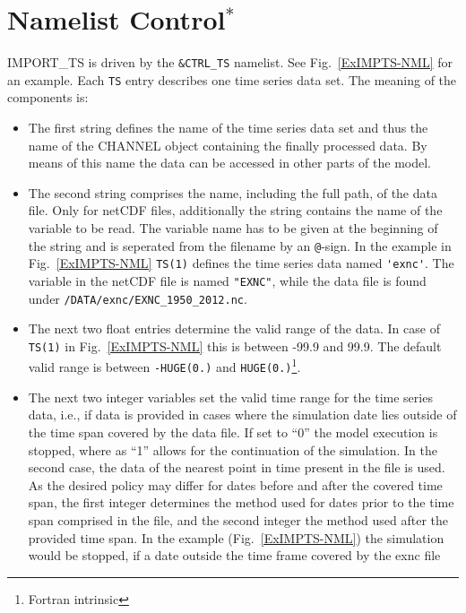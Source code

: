 \documentclass[11pt,twoside]{report}
\begin{document}
\section{Namelist Control$^*$\label{IMPTSNML}}
\renewcommand{\thefootnote}{\fnsymbol{footnote}}
\renewcommand{\thefootnote}{\arabic{footnote}}
IMPORT\_TS is driven by the \verb|&CTRL_TS| namelist. See  
Fig.~\ref{ExIMPTS-NML} for an example.
Each \verb|TS| entry describes one time series data set. The meaning of the
components is:
\begin{itemize}
\item The first string defines the name of the time series data set
  and thus the name of the CHANNEL object containing the finally
processed data. By means of this name the data can be
accessed in other parts of the model.
\item The second string comprises the name, including the full path, of the 
data file. Only for netCDF files, additionally the string contains the name
 of the variable to be read.
 The variable name has to be given at the beginning
of the string and is seperated from the filename by an \verb|@|-sign.
 In the example in Fig.~\ref{ExIMPTS-NML} 
\verb|TS(1)| defines the time series data named \verb|'exnc'|. The
 variable in the netCDF 
file is named \verb|"EXNC"|, while the data file is found under  
\verb|/DATA/exnc/EXNC_1950_2012.nc|.
\item The next two float entries determine the valid range of the data. 
In case of \verb|TS(1)| in  Fig.~\ref{ExIMPTS-NML} this is between -99.9 and 
99.9. The default valid range is between
\verb|-HUGE(0.)| and 
\verb|HUGE(0.)|\footnote{\label{FI}Fortran intrinsic}.
\item The next two integer variables set the valid time range for
  the time series data, i.e., 
 if data is provided in cases where the simulation date lies outside of the
time span covered by the data file. 
If set to ``0''  the model execution is stopped, where as ``1'' allows for
the continuation of the simulation. In the second case, the data of the 
nearest point in time present in the file is used.
As the desired policy may differ for dates before and after the covered 
time span, the first integer determines the method used for dates prior to
the time span comprised in the file, and the second integer the method
used after the provided time span. In the example
(Fig.~\ref{ExIMPTS-NML}) the simulation  
would be stopped, if a date outside the time frame covered by the exnc file 

\end{itemize}
\end{document}
